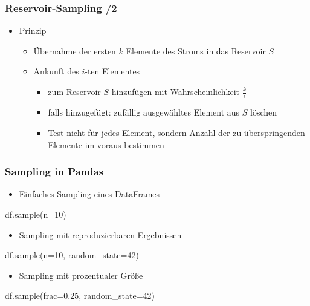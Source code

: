     
    \begin{frame}
    \frametitle{Reservoir-Sampling /2}
    
    \begin{itemize}
    \item Prinzip
    \begin{itemize}
    \item Übernahme der ersten $k$ Elemente des Stroms in das Reservoir
      $S$
    \item Ankunft des $i$-ten Elementes
    \begin{itemize}
    \item zum Reservoir $S$ hinzufügen mit Wahrscheinlichkeit
      $\frac{k}{i}$
    \item falls hinzugefügt: zufällig ausgewähltes Element aus $S$ löschen
    \item Test nicht für jedes Element, sondern Anzahl der zu
      überspringenden Elemente im voraus bestimmen
    \end{itemize}
    \end{itemize}
    \end{itemize}
    
    \end{frame}
    
    
    \begin{frame}
    \frametitle{Sampling in Pandas}
    
    \begin{itemize}
    \item Einfaches Sampling eines DataFrames
    \end{itemize}
    \begin{python}
    df.sample(n=10)
    \end{python}
    
    \begin{itemize}
    \item Sampling mit reproduzierbaren Ergebnissen
    \end{itemize}
    \begin{python}
    df.sample(n=10, random\_state=42)
    \end{python}
    
    \begin{itemize}
    \item Sampling mit prozentualer Größe
    \end{itemize}
    
    \begin{python}
    df.sample(frac=0.25, random\_state=42)
    \end{python}
    
    \end{frame}
    
